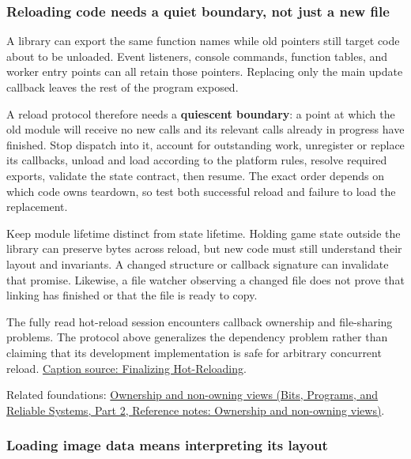 \subsubsection{Reloading code needs a quiet boundary, not just a new file}\label{06-engine-ii-ch027-reloading-code-needs-a-quiet-boundary-not-just-a-new-file}

\hypertarget{06-engine-ii-ch027-reloading-code-needs-a-quiet-boundary-not-just-a-new-file}{}

A library can export the same function names while old pointers still target code about to be unloaded. Event listeners, console commands, function tables, and worker entry points can all retain those pointers. Replacing only the main update callback leaves the rest of the program exposed.

A reload protocol therefore needs a \textbf{quiescent boundary}: a point at which the old module will receive no new calls and its relevant calls already in progress have finished. Stop dispatch into it, account for outstanding work, unregister or replace its callbacks, unload and load according to the platform rules, resolve required exports, validate the state contract, then resume. The exact order depends on which code owns teardown, so test both successful reload and failure to load the replacement.

Keep module lifetime distinct from state lifetime. Holding game state outside the library can preserve bytes across reload, but new code must still understand their layout and invariants. A changed structure or callback signature can invalidate that promise. Likewise, a file watcher observing a changed file does not prove that linking has finished or that the file is ready to copy.

The fully read hot-reload session encounters callback ownership and file-sharing problems. The protocol above generalizes the dependency problem rather than claiming that its development implementation is safe for arbitrary concurrent reload. \href{https://www.youtube.com/watch?v=U1C9mMrpyF4}{Caption source: Finalizing Hot-Reloading}.

Related foundations: \href{../01-Bits-Programs-and-Reliable-Systems-P02/main.pdf\#nameddest=appendix-d52e4486f527}{Ownership and non-owning views (Bits, Programs, and Reliable Systems, Part 2, Reference notes: Ownership and non-owning views)}.

\subsubsection{Loading image data means interpreting its layout}\label{06-engine-ii-ch027-loading-image-data-means-interpreting-its-layout}

